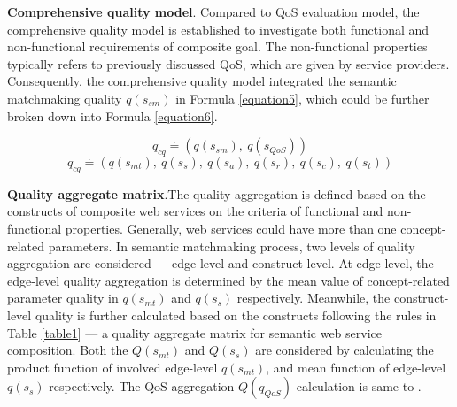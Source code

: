 \documentclass{llncs}
\begin{document}
\textbf{Comprehensive quality model}. Compared to QoS evaluation model, the comprehensive quality model is established to investigate both functional and non-functional requirements of composite goal. The non-functional properties typically refers to previously discussed QoS, which are given by service providers. Consequently, the comprehensive quality model integrated the semantic matchmaking quality $q(s_{sm})$ in Formula \ref{equation5}, which could be further broken down into Formula \ref{equation6}.

\begin{equation}
\label{equation5}
q_{cq} \stackrel{.}{=} (q(s_ {sm}), \  q(s_ {QoS}))
\end{equation}
\begin{equation}
\label{equation6}
q_{cq} \stackrel{.}{=} (q(s_ {mt}), \  q(s_ {s}), \  q(s_{a}),\  q(s_{r}),\  q(s_{c}),\  q(s_{t}))
\end{equation}

\textbf{Quality aggregate matrix}.The quality aggregation is defined based on the constructs of composite web services on the criteria of functional and non-functional properties. Generally, web services could have more than one concept-related parameters. In semantic matchmaking process, two levels of quality aggregation are considered --- edge level and construct level. At edge level, the edge-level quality aggregation is determined by the mean value of concept-related parameter quality in $q(s_{mt})$ and $q(s_{s})$ respectively. Meanwhile, the construct-level quality is further calculated based on the constructs following the rules in Table \ref{table1} --- a quality aggregate matrix for semantic web service composition. Both the $Q(s_{mt})$ and $Q(s_{s})$ are considered by calculating the product function of involved edge-level $q(s_{mt})$, and mean function of edge-level $q(s_{s})$ respectively. The QoS aggregation $Q(q_{QoS})$ calculation is same to \cite{cardoso2004quality}.
\end{document}
